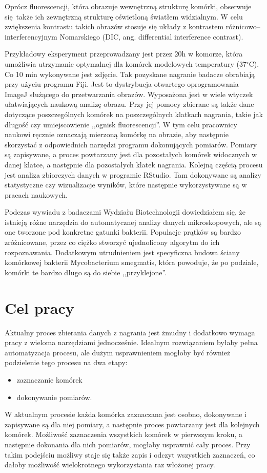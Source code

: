 \documentclass[declaration,shortabstract,mgr]{iithesis}
\begin{document}
Oprócz fluorescencji, która obrazuje wewnętrzną strukturę komórki, obserwuje się także ich zewnętrzną strukturę oświetloną światłem widzialnym.
W celu zwiększenia kontrastu takich obrazów stosuje się układy z kontrastem różnicowo--interferencyjnym Nomarskiego\cite{paper:dic} (DIC, ang. differential interference contrast).

Przykładowy eksperyment przeprowadzany jest przez 20h w komorze, która umożliwia utrzymanie optymalnej dla komórek modelowych temperatury (37$^{\circ}$C).
Co 10 min wykonywane jest zdjęcie.
Tak pozyskane nagranie badacze obrabiają przy użyciu programu Fiji\cite{imagej:fiji}.
Jest to dystrybucja otwartego oprogramowania ImageJ służącego do przetwarzania obrazów.
Wyposażona jest w wiele wtyczek ułatwiających naukową analizę obrazu.
Przy jej pomocy zbierane są także dane dotyczące poszczególnych komórek na poszczególnych klatkach nagrania, takie jak długość czy umiejscowienie ,,ognisk fluorescencji''.
W tym celu pracownicy naukowi ręcznie oznaczają mierzoną komórkę na obrazie, aby następnie skorzystać z odpowiednich narzędzi programu dokonujących pomiarów.
Pomiary są zapisywane, a proces powtarzany jest dla pozostałych komórek widocznych w danej klatce, a następnie dla pozostałych klatek nagrania.
Kolejną częścią procesu jest analiza zbiorczych danych w programie RStudio\cite{app:rstudio}.
Tam dokonywane są analizy statystyczne czy wizualizacje wyników, które następnie wykorzystywane są w pracach naukowych.

Podczas wywiadu z badaczami Wydziału Biotechnologii dowiedziałem się, że istnieją różne narzędzia do automatycznej analizy danych mikroskopowych, ale są one tworzone pod konkretne gatunki bakterii.
Populacje prątków są bardzo zróżnicowane, przez co ciężko stworzyć ujednolicony algorytm do ich rozpoznawania.
Dodatkowym utrudnieniem jest specyficzna budowa ściany komórkowej bakterii Mycobacterium smegmatis, która powoduje, że po podziale, komórki te bardzo długo są do siebie ,,przyklejone''.

\section{Cel pracy}
\label{sec:target}

Aktualny proces zbierania danych z nagrania jest żmudny i dodatkowo wymaga pracy z wieloma narzędziami jednocześnie.
Idealnym rozwiązaniem byłaby pełna automatyzacja procesu, ale dużym usprawnieniem mogłoby być również podzielenie tego procesu na dwa etapy:
\begin{itemize}
  \item zaznaczanie komórek
  \item dokonywanie pomiarów.
\end{itemize}
W aktualnym procesie każda komórka zaznaczana jest osobno, dokonywane i zapisywane są dla niej pomiary, a następnie proces powtarzany jest dla kolejnych komórek.
Możliwość zaznaczenia wszystkich komórek w pierwszym kroku, a następnie dokonania dla nich pomiarów, mogłaby usprawnić cały proces.
Przy takim podejściu możliwy staje się także zapis i odczyt wszystkich zaznaczeń, co dałoby możliwość wielokrotnego wykorzystania raz włożonej pracy.
\end{document}
